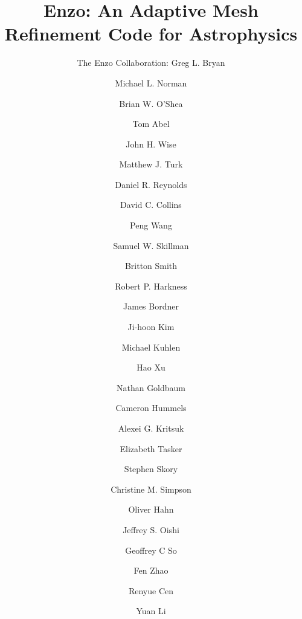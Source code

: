 \documentclass[onecolumn,iop]{emulateapj}  %
\begin{document}
\title{Enzo: An Adaptive Mesh Refinement Code for Astrophysics}
\author{The Enzo Collaboration: Greg L. Bryan}
\author{Michael L. Norman}
\author{Brian W. O'Shea}
\author{Tom Abel}
\author{John H. Wise}
\author{Matthew J. Turk}
\author{Daniel R. Reynolds}
\author{David C. Collins}
\author{Peng Wang}
\author{Samuel W. Skillman}
\author{Britton Smith}
\author{Robert P. Harkness}
\author{James Bordner}
\author{Ji-hoon Kim}
\author{Michael Kuhlen}
\author{Hao Xu}
\author{Nathan Goldbaum}
\author{Cameron Hummels}
\author{Alexei G. Kritsuk}
\author{Elizabeth Tasker}
\author{Stephen Skory}
\author{Christine M. Simpson}
\author{Oliver Hahn}
\author{Jeffrey S. Oishi}
\author{Geoffrey C So}
\author{Fen Zhao}
\author{Renyue Cen}
\author{Yuan Li}
\end{document}
